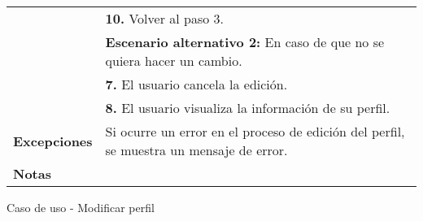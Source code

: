 \begin{analisisCasoDeUso}
\begin{tabular} { | m{3cm} | p{13cm} | }
		                            & {\bfseries 10.} Volver al paso 3.                                                        \\
		                            & {\bfseries Escenario alternativo 2:} En caso de que no se quiera hacer un cambio.        \\
		                            & {\bfseries 7.} El usuario cancela la edición.                                            \\
		                            & {\bfseries 8.} El usuario visualiza la información de su perfil.                         \\ \hline
		{\bfseries Excepciones}     & Si ocurre un error en el proceso de edición del perfil, se muestra un mensaje de error.  \\ \hline
		{\bfseries Notas }          &                                                                                          \\ \hline
	\end{tabular}
	\caption{Caso de uso - Modificar perfil}
\end{analisisCasoDeUso}